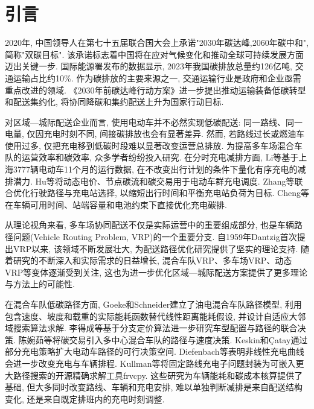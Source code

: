 \documentclass{setp-new}
\begin{document}
\maketitle
\clearpage


\section{引言}

2020年, 中国领导人在第七十五届联合国大会上承诺"2030年碳达峰,2060年碳中和", 简称"双碳目标".
该承诺标志着中国将在应对气候变化和推动全球可持续发展方面迈出关键一步.
国际能源署发布的数据显示, 2023年我国碳排放总量约126亿吨, 交通运输占比约10\%.
作为碳排放的主要来源之一, 交通运输行业是政府和企业亟需重点改进的领域.
《2030年前碳达峰行动方案》进一步提出推动运输装备低碳转型和配送集约化\cite{ref:55},
将协同降碳和集约配送上升为国家行动目标.

对区域—城际配送企业而言, 使用电动车并不必然实现低碳配送:
同一路线、同一电量, 仅因充电时刻不同, 间接碳排放也会有显著差异.
然而, 若路线过长或燃油车使用过多, 仅把充电移到低碳时段难以显著改变运营总排放.
为提高多车场混合车队的运营效率和碳效率, 众多学者纷纷投入研究.
在分时充电减排方面, Li等\cite{ref:52}基于上海3777辆电动车11个月的运行数据,
在不改变出行计划的条件下量化有序充电的减排潜力.
Hu等\cite{ref:53}将动态电价、节点碳流和碳交易用于电动车群充电调度.
Zhang等\cite{ref:54}联合优化行驶路径与充电站选择, 以缩短出行时间和平衡充电站负荷为目标.
Cheng等\cite{ref:50}在车辆可用时间、站端容量和电池约束下直接优化充电碳排.

从理论视角来看, 多车场协同配送不仅是实际运营中的重要组成部分,
也是车辆路径问题(Vehicle Routing Problem, VRP)的一个重要分支.
自1959年Dantzig首次提出VRP以来, 该领域不断发展壮大,
为配送路径优化研究提供了坚实的理论支持.
随着研究的不断深入和实际需求的日益增长,
混合车队VRP、多车场VRP、动态VRP等变体逐渐受到关注,
这也为进一步优化区域—城际配送方案提供了更多理论与方法上的可能性.

在混合车队低碳路径方面, Goeke和Schneider\cite{ref:27}建立了油电混合车队路径模型,
利用包含速度、坡度和载重的实际能耗函数替代线性距离能耗假设,
并设计自适应大邻域搜索算法求解.
李得成等\cite{ref:6}基于分支定价算法进一步研究车型配置与路径的联合决策.
陈婉茹等\cite{ref:23}将碳交易引入多中心混合车队的路径与速度决策.
Keskin和\c{C}atay\cite{ref:45}通过部分充电策略扩大电动车路径的可行决策空间.
Diefenbach等\cite{ref:46}表明非线性充电曲线会进一步改变充电与车辆排程.
Kullman等\cite{ref:73}将固定路线充电子问题封装为可嵌入更大路径搜索的开源精确求解工具frvcpy.
这些研究为车辆能耗和碳成本核算提供了基础,
但大多同时改变路线、车辆和充电安排,
难以单独判断减排是来自配送结构变化, 还是来自既定排班内的充电时刻调整.
\end{document}
